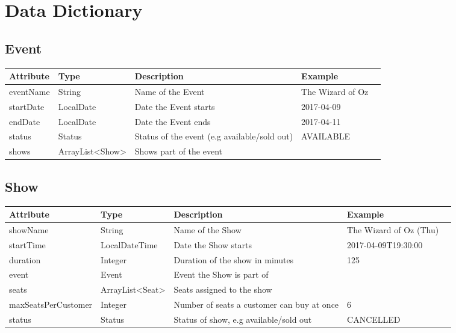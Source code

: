 \chapter{Data Dictionary}

\section{Event}
\keepXColumns
\begin{tabularx}{\linewidth}{l l l X l}
  \textbf{Attribute}&\textbf{Type}&\textbf{Description}&\textbf{Example}\\
  \endhead
  eventName & String          & Name of the Event                             & The Wizard of Oz\\
  startDate & LocalDate       & Date the Event starts                         & 2017-04-09\\
  endDate   & LocalDate       & Date the Event ends                           & 2017-04-11\\
  status    & Status          & Status of the event (e.g available/sold out)  & AVAILABLE \\
  shows     & ArrayList<Show> & Shows part of the event                       &
\end{tabularx}

\section{Show}
\keepXColumns
\begin{tabularx}{\linewidth}{l l l X l}
  \textbf{Attribute}&\textbf{Type}&\textbf{Description}&\textbf{Example}\\
  \endhead
  showName  & String            & Name of the Show                            & The Wizard of Oz (Thu)\\
  startTime & LocalDateTime     & Date the Show starts                        & 2017-04-09T19:30:00\\
  duration  & Integer           & Duration of the show in minutes             & 125\\
  event     & Event             & Event the Show is part of                   &\\
  seats     & ArrayList<Seat>   & Seats assigned to the show                  &\\
  maxSeatsPerCustomer & Integer & Number of seats a customer can buy at once  & 6\\
  status    & Status            & Status of show, e.g available/sold out      & CANCELLED
\end{tabularx}

